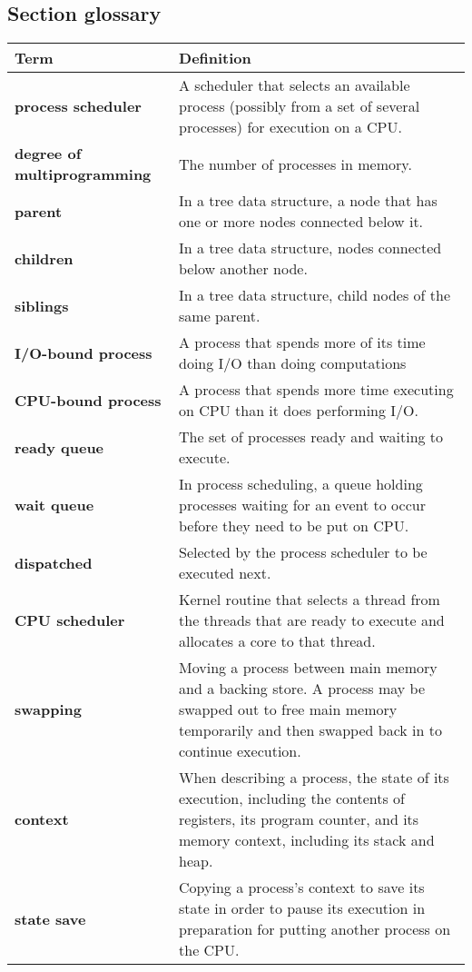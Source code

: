 \subsection*{Section glossary}
\centering
\begin{tabular}{>{\raggedright}p{} >{\raggedright\arraybackslash}p{}}
\toprule
\textbf{Term} & \textbf{Definition} \\
\midrule
\textbf{process scheduler} & A scheduler that selects an available process (possibly from a set of several processes) for execution on a CPU. \\
\textbf{degree of multiprogramming} & The number of processes in memory. \\
\textbf{parent} & In a tree data structure, a node that has one or more nodes connected below it. \\
\textbf{children} & In a tree data structure, nodes connected below another node. \\
\textbf{siblings} & In a tree data structure, child nodes of the same parent. \\
\textbf{I/O-bound process} & A process that spends more of its time doing I/O than doing computations \\
\textbf{CPU-bound process} & A process that spends more time executing on CPU than it does performing I/O. \\
\textbf{ready queue} & The set of processes ready and waiting to execute. \\
\textbf{wait queue} & In process scheduling, a queue holding processes waiting for an event to occur before they need to be put on CPU. \\
\textbf{dispatched} & Selected by the process scheduler to be executed next. \\
\textbf{CPU scheduler} & Kernel routine that selects a thread from the threads that are ready to execute and allocates a core to that thread. \\
\textbf{swapping} & Moving a process between main memory and a backing store. A process may be swapped out to free main memory temporarily and then swapped back in to continue execution. \\
\textbf{context} & When describing a process, the state of its execution, including the contents of registers, its program counter, and its memory context, including its stack and heap. \\
\textbf{state save} & Copying a process's context to save its state in order to pause its execution in preparation for putting another process on the CPU. \\

\end{tabular}
